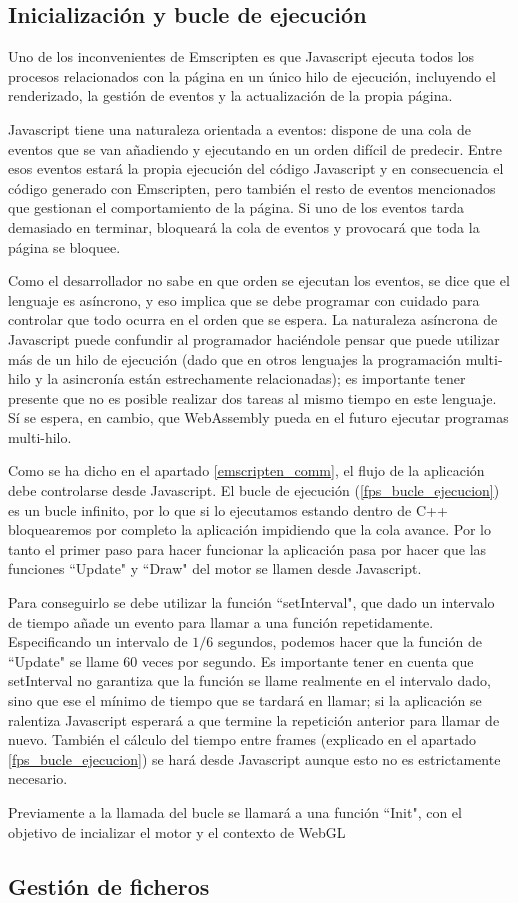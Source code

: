\subsection{Inicialización y bucle de ejecución}
\label{init_emscripten}
Uno de los inconvenientes de Emscripten es que Javascript ejecuta todos los procesos relacionados con la página en un único hilo de ejecución, incluyendo el renderizado, la gestión de eventos y la actualización de la propia página.

Javascript tiene una naturaleza orientada a eventos: dispone de una cola de eventos que se van añadiendo y ejecutando en un orden difícil de predecir. Entre esos eventos estará la propia ejecución del código Javascript y en consecuencia el código generado con Emscripten, pero también el resto de eventos mencionados que gestionan el comportamiento de la página. Si uno de los eventos tarda demasiado en terminar, bloqueará la cola de eventos y provocará que toda la página se bloquee.

Como el desarrollador no sabe en que orden se ejecutan los eventos, se dice que el lenguaje es asíncrono, y eso implica que se debe programar con cuidado para controlar que todo ocurra en el orden que se espera. La naturaleza asíncrona de Javascript puede confundir al programador haciéndole pensar que puede utilizar más de un hilo de ejecución (dado que en otros lenguajes la programación multi-hilo y la asincronía están estrechamente relacionadas); es importante tener presente que no es posible realizar dos tareas al mismo tiempo en este lenguaje. Sí se espera, en cambio, que WebAssembly pueda en el futuro ejecutar programas multi-hilo.

Como se ha dicho en el apartado \ref{emscripten_comm}, el flujo de la aplicación debe controlarse desde Javascript. El bucle de ejecución (\ref{fps_bucle_ejecucion}) es un bucle infinito, por lo que si lo ejecutamos estando dentro de C++ bloquearemos por completo la aplicación impidiendo que la cola avance. Por lo tanto el primer paso para hacer funcionar la aplicación pasa por hacer que las funciones ``Update" y ``Draw" del motor se llamen desde Javascript.

Para conseguirlo se debe utilizar la función ``setInterval", que dado un intervalo de tiempo añade un evento para llamar a una función repetidamente. Especificando un intervalo de $1/6$ segundos, podemos hacer que la función de ``Update" se llame 60 veces por segundo. Es importante tener en cuenta que setInterval no garantiza que la función se llame realmente en el intervalo dado, sino que ese el mínimo de tiempo que se tardará en llamar; si la aplicación se ralentiza Javascript esperará a que termine la repetición anterior para llamar de nuevo. También el cálculo del tiempo entre frames (explicado en el apartado \ref{fps_bucle_ejecucion}) se hará desde Javascript aunque esto no es estrictamente necesario.

Previamente a la llamada del bucle se llamará a una función ``Init", con el objetivo de incializar el motor y el contexto de WebGL

\subsection{Gestión de ficheros}
